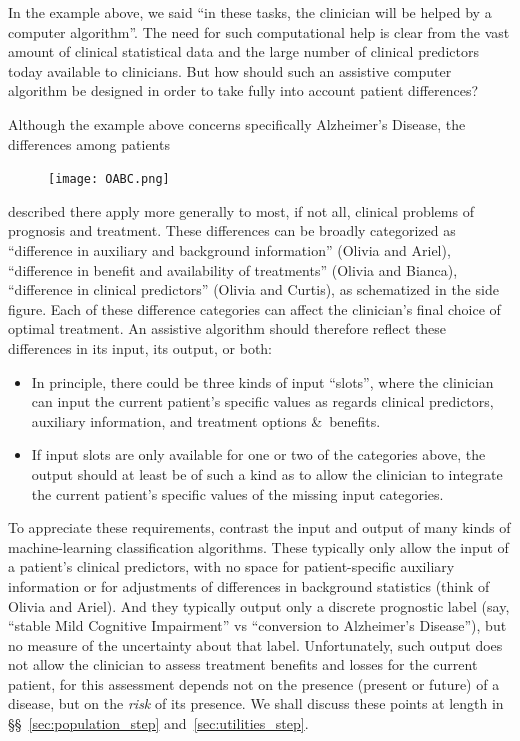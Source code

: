 \documentclass[utf8]{FrontiersinHarvard} %
\newcommand*{\pencil}{{\fontencoding{U}\fontfamily{fontawesometwo}\selectfont\symbol{210}}}
\newcommand{\mynotep}[1]{{\color{notecolour}\pencil\ #1}}
\newcommand*{\amp}{\&}
\newcommand*{\sects}{\S\S}%
\renewcommand*{\|}[1][]{\nonscript\:#1\vert\nonscript\:\mathopen{}}
\newcommand*{\ad}{Alzheimer's Disease}
\newcommand*{\mci}{Mild Cognitive Impairment}
\begin{document}
In the example above, we said \enquote{in these tasks, the clinician will be helped by a computer algorithm}. The need for such computational help is clear from the vast amount of clinical statistical data and the large number of clinical predictors today available to clinicians. But how should such an assistive computer algorithm be designed in order to take fully into account patient differences?

Although the example above concerns specifically \ad, the differences among patients
\begin{figure}%
\vspace{-1.5em}%
\texttt{[image: OABC.png]}%
\vspace{-2em}%
\end{figure}
described there apply more generally to most, if not all, clinical problems of prognosis and treatment. These differences can be broadly categorized as \enquote{difference in auxiliary and background information} (Olivia and Ariel), \enquote{difference in benefit and availability of treatments} (Olivia and Bianca), \enquote{difference in clinical predictors} (Olivia and Curtis), as schematized in the side figure. Each of these difference categories can affect the clinician's final choice of optimal treatment. An assistive algorithm should therefore reflect these differences in its input, its output, or both:
\begin{itemize}
\item In principle, there could be three kinds of input \enquote{slots}, where the clinician can input the current patient's specific values as regards clinical predictors, auxiliary information, and treatment options \amp\ benefits.
\item If input slots are only available for one or two of the categories above, the output should at least be of such a kind as to allow the clinician to integrate the current patient's specific values of the missing input categories.
\end{itemize}

To appreciate these requirements, contrast the input and output of many kinds of machine-learning classification algorithms. These typically only allow the input of a patient's clinical predictors, with no space for patient-specific auxiliary information or for adjustments of differences in background statistics (think of Olivia and Ariel). And they typically output only a discrete prognostic label (say, \enquote{stable \mci} vs \enquote{conversion to \ad}), but no measure of the uncertainty about that label. Unfortunately, such output does not allow the clinician to assess treatment benefits and losses for the current patient, for this assessment depends not on the presence (present or future) of a disease, but on the \emph{risk} of its presence. We shall discuss these points at length in \sects~\ref{sec:population_step} and~\ref{sec:utilities_step}.
\end{document}
